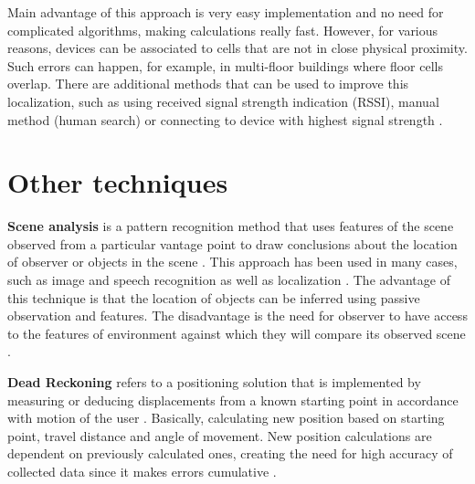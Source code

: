 Main advantage of this approach is very easy implementation and no need for complicated algorithms, making calculations really fast. However, for various reasons, devices can be associated to cells that are not in close physical proximity. Such errors can happen, for example, in multi-floor buildings where floor cells overlap. There are additional methods that can be used to improve this localization, such as using received signal strength indication (RSSI), manual method (human search) or connecting to device with highest signal strength \cite{WiFiLBS, RAinWILTaS}.

\section{Other techniques}
\textbf{Scene analysis} is a pattern recognition method that uses features of the scene observed from a particular vantage point to draw conclusions about the location of observer or objects in the scene \cite{LSfUC}. This approach has been used in many cases, such as image and speech recognition as well as localization \cite{LSAWIFI}. The advantage of this technique is that the location of objects can be inferred using passive observation and features. The disadvantage is the need for observer to have access to the features of environment against which they will compare its observed scene \cite{LSfUC}.

\medskip

\textbf{Dead Reckoning} refers to a positioning solution that is implemented by measuring or deducing displacements from a known starting point in accordance with motion of the user \cite{DRNS}. Basically, calculating new position based on starting point, travel distance and angle of movement. New position calculations are dependent on previously calculated ones, creating the need for high accuracy of collected data since it makes errors cumulative \cite{IDRAIP}.
